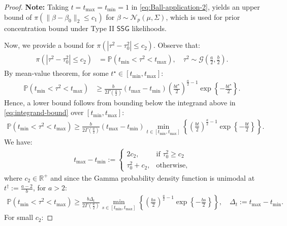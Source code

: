 \documentclass[12pt]{article}
\numberwithin{equation}{section}
\begin{document}
\begin{proof}
\textbf{Note:} Taking $t = t_{\max} = t_{\min} = 1$ in \eqref{eq:Ball-application-2}, yields an upper bound of $\pi\left(\lVert \beta-\beta_0\rVert_2\leq c_1\right)$ for $\beta \sim \mathcal{N}_p(\mu, \Sigma)$, which is used for prior concentration bound under Type II $\mathsf{SSG}$ likelihoods.

Now, we provide a bound for $\pi\left(|\tau^2-\tau_0^2| \leq c_2\right)$. Observe that:
%
\begin{align}\label{eq:proof-lemma-anderson-ng-2}
\begin{split}
\pi\left(|\tau^2-\tau_0^2| \leq c_2\right) 
&= \mathbb{P}(t_{\min} < \tau^2 < t_{\max}), \quad \tau^2\sim \mathcal{G}\left(\frac{a}{2}, \frac{b}{2}\right).
\end{split}
\end{align}
By mean-value theorem, for some $t^{\star} \in [t_{\min}, t_{\max}]$:
\begin{align}\label{eq:integrand-bound}
    \mathbb{P}(t_{\min} < \tau^2 < t_{\max}) &\geq \frac{b}{2\Gamma\left(\frac{a}{2}\right)} (t_{\max} - t_{\min}) \left(\frac{b t^{\star}}{2}\right)^{\frac{a}{2}-1}\exp\left\{-\frac{b t^{\star}}{2}\right\}.
\end{align}
Hence, a lower bound follows from bounding below the integrand above in \eqref{eq:integrand-bound} over $[t_{\min}, t_{\max}]$:
\begin{align}
    \mathbb{P}(t_{\min} < \tau^2 < t_{\max}) \geq \frac{b}{2\Gamma\left(\frac{a}{2}\right)}(t_{\max} - t_{\min}) \min_{t\in [t_{\min}, t_{\max}]}\left\{\left(\frac{bt}{2}\right)^{\frac{a}{2}-1}\exp\left\{-\frac{bt}{2}\right\}\right\}.
\end{align}
We have:
\begin{align}
    t_{\max} - t_{\min} := \begin{cases}
        2 c_2, & \text{if }\tau_0^2 \geq c_2\\
        \tau_0^2 + c_2, & \text{otherwise},
    \end{cases}
\end{align}
where $c_2\in \mathbb{R}^{+}$ and since the Gamma probability density function is unimodal at $t^{\dagger}:= \frac{a-2}{b}$, for $a>2$:
\begin{align}
    \mathbb{P}(t_{\min} < \tau^2 < t_{\max}) \geq \frac{b \Delta_t}{2\Gamma\left(\frac{a}{2}\right)}\min_{s\in [t_{\min}, t_{\max}]}\left\{\left(\frac{bs}{2}\right)^{\frac{a}{2}-1}\exp\left\{-\frac{bs}{2}\right\}\right\},\quad \Delta_t:= t_{\max} - t_{\min}.
\end{align}
For small $c_2$:

\end{proof}
\end{document}
